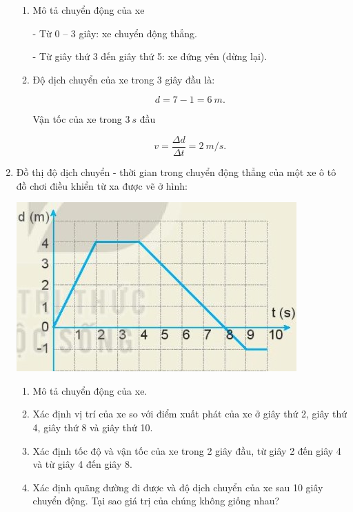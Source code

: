 \begin{enumerate}[label=\bfseries Bài \arabic*:]
{\begin{enumerate}[label=\alph*)]
			\item Mô tả chuyển động của xe
			
			- Từ 0 – 3 giây: xe chuyển động thẳng.
			
			- Từ giây thứ 3 đến giây thứ 5: xe đứng yên (dừng lại).
			
			
			\item 
			Độ dịch chuyển của xe trong 3 giây đầu là:
			
			$$d = 7-1 = \SI{6}{m}.$$
			
			Vận tốc của xe trong $\SI{3}{s}$ đầu
			
			$$v = \dfrac{\Delta d}{\Delta t} = \SI{2}{m/s}.$$
			
		\end{enumerate}
	}
	\item {}
	
	{
		Đồ thị độ dịch chuyển - thời gian trong chuyển động thẳng của một xe ô tô đồ chơi điều khiển từ xa được vẽ ở hình: 
		\begin{center}
			\includegraphics[scale=1]{../figs/VN10-2022-PH-TP006-4.jpg}
		\end{center}
		
		
		\begin{enumerate}[label=\alph*)]
			\item Mô tả chuyển động của xe.
			\item Xác định vị trí của xe so với điểm xuất phát của xe ở giây thứ 2, giây thứ 4, giây thứ 8 và giây thứ 10.
			\item Xác định tốc độ và vận tốc của xe trong 2 giây đầu, từ giây 2 đến giây 4 và từ giây 4 đến giây 8.
			\item Xác định quãng đường đi được và độ dịch chuyển của xe sau 10 giây chuyển động. Tại sao giá trị của chúng không giống nhau?
		\end{enumerate}
	}
\end{enumerate}
